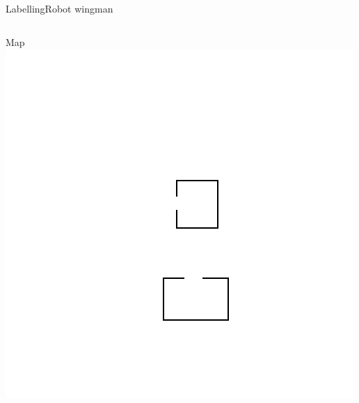 \begin{frame}{Labelling}{Robot wingman}
\begin{columns}
\end{columns}


\begin{columns}


\begin{minipage}{\textwidth}
\begin{block}{Map}
\centering
\includegraphics[width = \textwidth]{./figure/simulation/map.png}
\end{block}
\end{minipage}


\end{columns}
\end{frame}
